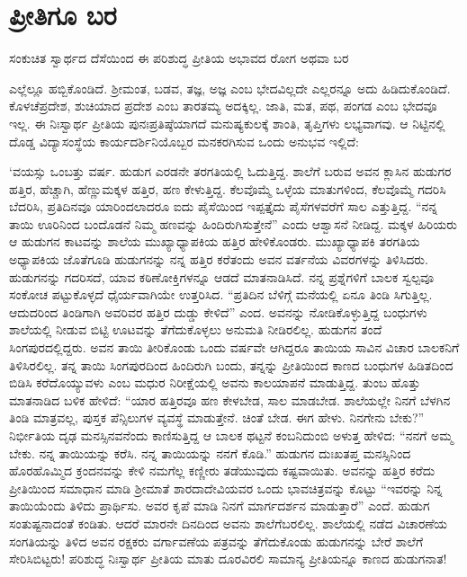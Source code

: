 \section*{ಪ್ರೀತಿಗೂ ಬರ}


{\parfillskip=0pt ಸಂಕುಚಿತ ಸ್ವಾರ್ಥದ ದೆಸೆಯಿಂದ ಈ ಪರಿಶುದ್ಧ ಪ್ರೀತಿಯ ಅಭಾವದ ರೋಗ ಅಥವಾ ಬರ\par}\newpage\noindent ಎಲ್ಲೆಲ್ಲೂ ಹಬ್ಬಿಕೊಂಡಿದೆ. ಶ‍್ರೀಮಂತ, ಬಡವ, ತಜ್ಞ, ಅಜ್ಞ ಎಂಬ ಭೇದವಿಲ್ಲದೇ ಎಲ್ಲರನ್ನೂ ಅದು ಹಿಡಿದುಕೊಂಡಿದೆ. ಕೊಳಚೆಪ್ರದೇಶ, ಶುಚಿಯಾದ ಪ್ರದೇಶ ಎಂಬ ತಾರತಮ್ಯ ಅದಕ್ಕಿಲ್ಲ. ಜಾತಿ, ಮತ, ಪಥ, ಪಂಗಡ ಎಂಬ ಭೇದವೂ ಇಲ್ಲ. ಈ ನಿಃಸ್ವಾರ್ಥ ಪ್ರೀತಿಯ ಪುನಃಪ್ರತಿಷ್ಠೆಯಾಗದೆ ಮನುಷ್ಯಕುಲಕ್ಕೆ ಶಾಂತಿ, ತೃಪ್ತಿಗಳು ಲಭ್ಯವಾಗವು. ಆ ನಿಟ್ಟಿನಲ್ಲಿ ದೊಡ್ಡ ವಿದ್ಯಾಸಂಸ್ಥೆಯ ಕಾರ್ಯದರ್ಶಿನಿಯೊಬ್ಬರ ಮನಕರಗಿಸುವ ಒಂದು ಅನುಭವ ಇಲ್ಲಿದೆ:

‘ವಯಸ್ಸು ಒಂಬತ್ತು ವರ್ಷ. ಹುಡುಗ ಎರಡನೇ ತರಗತಿಯಲ್ಲಿ ಓದುತ್ತಿದ್ದ. ಶಾಲೆಗೆ ಬರುವ ಅವನ ಕ್ಲಾಸಿನ ಹುಡುಗರ ಹತ್ತಿರ, ಹೆಚ್ಚಾಗಿ, ಹೆಣ್ಣುಮಕ್ಕಳ ಹತ್ತಿರ, ಹಣ ಕೇಳುತ್ತಿದ್ದ. ಕೆಲವೊಮ್ಮೆ ಒಳ್ಳೆಯ ಮಾತುಗಳಿಂದ, ಕೆಲವೊಮ್ಮೆ ಗದರಿಸಿ ಬೆದರಿಸಿ, ಪ್ರತಿದಿನವೂ ಯಾರಿಂದಲಾದರೂ ಐದು ಪೈಸೆಯಿಂದ ಇಪ್ಪತ್ತೈದು ಪೈಸೆಗಳವರೆಗೆ ಸಾಲ ಎತ್ತುತ್ತಿದ್ದ. “ನನ್ನ ತಾಯಿ ಊರಿನಿಂದ ಬಂದೊಡನೆ ನಿಮ್ಮ ಹಣವನ್ನು ಹಿಂದಿರುಗಿಸುತ್ತೇನೆ” ಎಂದು ಆಶ್ವಾಸನೆ ನೀಡಿದ್ದ. ಮಕ್ಕಳ ಹಿರಿಯರು ಆ ಹುಡುಗನ ಕಾಟವನ್ನು ಶಾಲೆಯ ಮುಖ್ಯಾಧ್ಯಾಪಕಿಯ ಹತ್ತಿರ ಹೇಳಿಕೊಂಡರು. ಮುಖ್ಯಾಧ್ಯಾಪಕಿ ತರಗತಿಯ ಅಧ್ಯಾಪಕಿಯ ಜೊತೆಗೂಡಿ ಹುಡುಗನನ್ನು ನನ್ನ ಹತ್ತಿರ ಕರೆತಂದು ಅವನ ವರ್ತನೆಯ ವಿವರಗಳನ್ನು ತಿಳಿಸಿದರು. ಹುಡುಗನನ್ನು ಗದರಿಸದೆ, ಯಾವ ಕಠಿಣೋಕ್ತಿಗಳನ್ನೂ ಆಡದೆ ಮಾತನಾಡಿಸಿದೆ. ನನ್ನ ಪ್ರಶ್ನೆಗಳಿಗೆ ಬಾಲಕ ಸ್ವಲ್ಪವೂ ಸಂಕೋಚ ಪಟ್ಟುಕೊಳ್ಳದೆ ಧೈರ್ಯವಾಗಿಯೇ ಉತ್ತರಿಸಿದ. “ಪ್ರತಿದಿನ ಬೆಳಿಗ್ಗೆ ಮನೆಯಲ್ಲಿ ಏನೂ ತಿಂಡಿ ಸಿಗುತ್ತಿಲ್ಲ. ಆದುದರಿಂದ ತಿಂಡಿಗಾಗಿ ಅವರಿವರ ಹತ್ತಿರ ದುಡ್ಡು ಕೇಳಿದೆ” ಎಂದ. ಅವನನ್ನು ನೋಡಿಕೊಳ್ಳುತ್ತಿದ್ದ ಬಂಧುಗಳು ಶಾಲೆಯಲ್ಲಿ ನೀಡುವ ಬಿಟ್ಟಿ ಊಟವನ್ನು ತೆಗೆದುಕೊಳ್ಳಲು ಅನುಮತಿ ನೀಡಿರಲಿಲ್ಲ. ಹುಡುಗನ ತಂದೆ ಸಿಂಗಪುರದಲ್ಲಿದ್ದರು. ಅವನ ತಾಯಿ ತೀರಿಕೊಂಡು ಒಂದು ವರ್ಷವೇ ಆಗಿದ್ದರೂ ತಾಯಿಯ ಸಾವಿನ ವಿಚಾರ ಬಾಲಕನಿಗೆ ತಿಳಿಸಿರಲಿಲ್ಲ. ತನ್ನ ತಾಯಿ ಸಿಂಗಪುರದಿಂದ ಹಿಂದಿರುಗಿ ಬಂದು, ತನ್ನನ್ನು ಪ್ರೀತಿಯಿಂದ ಕಾಣದ ಬಂಧುಗಳ ಹಿಡಿತದಿಂದ ಬಿಡಿಸಿ ಕರೆದೊಯ್ಯುವಳು ಎಂಬ ಮಧುರ ನಿರೀಕ್ಷೆಯಲ್ಲಿ ಅವನು ಕಾಲಯಾಪನೆ ಮಾಡುತ್ತಿದ್ದ. ತುಂಬ ಹೊತ್ತು ಮಾತನಾಡಿದ ಬಳಿಕ ಹೇಳಿದೆ: “ಯಾರ ಹತ್ತಿರವೂ ಹಣ ಕೇಳಬೇಡ, ಸಾಲ ಮಾಡಬೇಡ. ಶಾಲೆಯಲ್ಲೇ ನಿನಗೆ ಬೆಳಗಿನ ತಿಂಡಿ ಮಾತ್ರವಲ್ಲ, ಪುಸ್ತಕ ಪೆನ್ಸಿಲುಗಳ ವ್ಯವಸ್ಥೆ ಮಾಡುತ್ತೇನೆ. ಚಿಂತೆ ಬೇಡ. ಈಗ ಹೇಳು. ನಿನಗೇನು ಬೇಕು?” ನಿರ್ಭೀತಿಯ ದೃಢ ಮನಸ್ಸಿನವನೆಂದು ಕಾಣಿಸುತ್ತಿದ್ದ ಆ ಬಾಲಕ ಥಟ್ಟನೆ ಕಂಬನಿದುಂಬಿ ಅಳುತ್ತ ಹೇಳಿದ: “ನನಗೆ ಅಮ್ಮ ಬೇಕು. ನನ್ನ ತಾಯಿಯನ್ನು ಕರೆಸಿ. ನನ್ನ ತಾಯಿಯನ್ನು ನನಗೆ ಕೊಡಿ.” ಹುಡುಗನ ದುಃಖತಪ್ತ ಮನಸ್ಸಿನಿಂದ ಹೊರಹೊಮ್ಮಿದ ಕ್ರಂದನವನ್ನು ಕೇಳಿ ನಮಗೆಲ್ಲ ಕಣ್ಣೀರು ತಡೆಯುವುದು ಕಷ್ಟವಾಯಿತು. ಅವನನ್ನು ಹತ್ತಿರ ಕರೆದು ಪ್ರೀತಿಯಿಂದ ಸಮಾಧಾನ ಮಾಡಿ ಶ‍್ರೀಮಾತೆ ಶಾರದಾದೇವಿಯವರ ಒಂದು ಭಾವಚಿತ್ರವನ್ನು ಕೊಟ್ಟು “ಇವರನ್ನು ನಿನ್ನ ತಾಯಿಯೆಂದು ತಿಳಿದು ಪ್ರಾರ್ಥಿಸು. ಅವರ ಕೃಪೆ ಮಾಡಿ ನಿನಗೆ ಮಾರ್ಗದರ್ಶನ ಮಾಡುತ್ತಾರೆ” ಎಂದೆ. ಹುಡುಗ ಸಂತುಷ್ಟನಾದಂತೆ ಕಂಡಿತು. ಆದರೆ ಮಾರನೇ ದಿನದಿಂದ ಅವನು ಶಾಲೆಗೆ\break ಬರಲಿಲ್ಲ. ಶಾಲೆಯಲ್ಲಿ ನಡೆದ ವಿಚಾರಣೆಯ ಸಂಗತಿಯನ್ನು ತಿಳಿದ ಅವನ ರಕ್ಷಕರು ವರ್ಗಾ\-ವಣೆಯ ಪತ್ರವನ್ನು ತೆಗೆದುಕೊಂಡು ಹುಡುಗನನ್ನು ಬೇರೆ ಶಾಲೆಗೆ ಸೇರಿಸಿಬಿಟ್ಟರು! ಪರಿಶುದ್ಧ ನಿಃಸ್ವಾರ್ಥ ಪ್ರೀತಿಯ ಮಾತು ದೂರವಿರಲಿ ಸಾಮಾನ್ಯ ಪ್ರೀತಿಯನ್ನೂ ಕಾಣದ ಹುಡುಗನಾತ!

